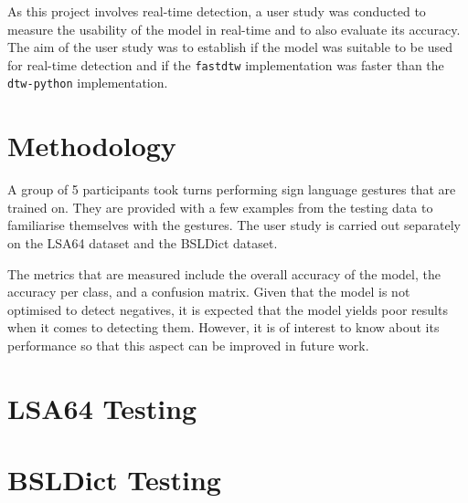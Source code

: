 \documentclass[final,rdr32.tex]{subfiles}
\begin{document}
As this project involves real-time detection, a user study was conducted to measure the usability of the model in real-time and to also evaluate its accuracy. The aim of the user study was to establish if the model was suitable to be used for real-time detection and if the \verb|fastdtw| implementation was faster than the \verb|dtw-python| implementation.

\section{Methodology}

A group of 5 participants took turns performing sign language gestures that are trained on. They are provided with a few examples from the testing data to familiarise themselves with the gestures. The user study is carried out separately on the LSA64 dataset and the BSLDict dataset.

The metrics that are measured include the overall accuracy of the model, the accuracy per class, and a confusion matrix. Given that the model is not optimised to detect negatives, it is expected that the model yields poor results when it comes to detecting them. However, it is of interest to know about its performance so that this aspect can be improved in future work.

\section{LSA64 Testing}

\section{BSLDict Testing}
\end{document}
